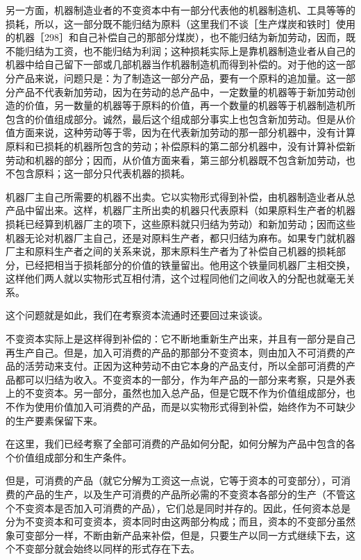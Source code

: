 另一方面，机器制造业者的不变资本中有一部分代表他的机器制造机、工具等等的损耗，所以，这一部分既不能归结为原料（这里我们不谈［生产煤炭和铁时］使用的机器［298］和自己补偿自己的那部分煤炭），也不能归结为新加劳动，因而，既不能归结为工资，也不能归结为利润；这种损耗实际上是靠机器制造业者从自己的机器中给自己留下一部或几部机器当作机器制造机而得到补偿的。对于他的这一部分产品来说，问题只是：为了制造这一部分产品，要有一个原料的追加量。这一部分产品不代表新加劳动，因为在劳动的总产品中，一定数量的机器等于新加劳动创造的价值，另一数量的机器等于原料的价值，再一个数量的机器等于机器制造机所包含的价值组成部分。诚然，最后这个组成部分事实上也包含新加劳动。但是从价值方面来说，这种劳动等于零，因为在代表新加劳动的那一部分机器中，没有计算原料和已损耗的机器所包含的劳动；补偿原料的第二部分机器中，没有计算补偿新劳动和机器的部分；因而，从价值方面来看，第三部分机器既不包含新加劳动，也不包含原料；这一部分只代表机器的损耗。

机器厂主自己所需要的机器不出卖。它以实物形式得到补偿，由机器制造业者从总产品中留出来。这样，机器厂主所出卖的机器只代表原料（如果原料生产者的机器损耗已经算到机器厂主的项下，这些原料就只归结为劳动）和新加劳动；因而这些机器无论对机器厂主自己，还是对原料生产者，都只归结为麻布。如果专门就机器厂主和原料生产者之间的关系来说，那末原料生产者为了补偿自己机器的损耗部分，已经把相当于损耗部分的价值的铁量留出。他用这个铁量同机器厂主相交换，这样他们两人就以实物形式互相付清，这个过程同他们之间收入的分配也就毫无关系。

这个问题就是如此，我们在考察资本流通时还要回过来谈谈。

不变资本实际上是这样得到补偿的：它不断地重新生产出来，并且有一部分是自己再生产自己。但是，加入可消费的产品的那部分不变资本，则由加入不可消费的产品的活劳动来支付。正因为这种劳动不由它本身的产品支付，所以全部可消费的产品都可以归结为收入。不变资本的一部分，作为年产品的一部分来考察，只是外表上的不变资本。另一部分，虽然也加入总产品，但是它既不作为价值组成部分，也不作为使用价值加入可消费的产品，而是以实物形式得到补偿，始终作为不可缺少的生产要素保留下来。

在这里，我们已经考察了全部可消费的产品如何分配，如何分解为产品中包含的各个价值组成部分和生产条件。

但是，可消费的产品（就它分解为工资这一点说，它等于资本的可变部分），可消费的产品的生产，以及生产可消费的产品所必需的不变资本各部分的生产（不管这个不变资本是否加入可消费的产品），它们总是同时并存的。因此，任何资本总是分为不变资本和可变资本，资本同时由这两部分构成；而且，资本的不变部分虽然象可变部分一样，不断由新产品来补偿，但是，只要生产以同一方式继续下去，这个不变部分就会始终以同样的形式存在下去。

